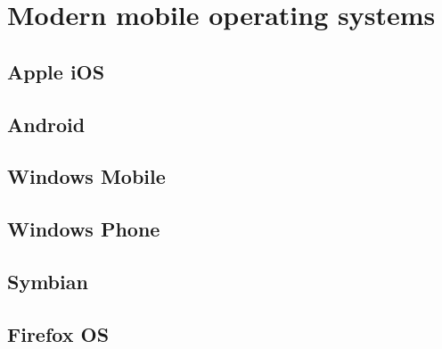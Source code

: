 \section{Modern mobile operating systems}

\subsection{Apple iOS}

\subsection{Android}

\subsection{Windows Mobile}

\subsection{Windows Phone}

\subsection{Symbian}

\subsection{Firefox OS}